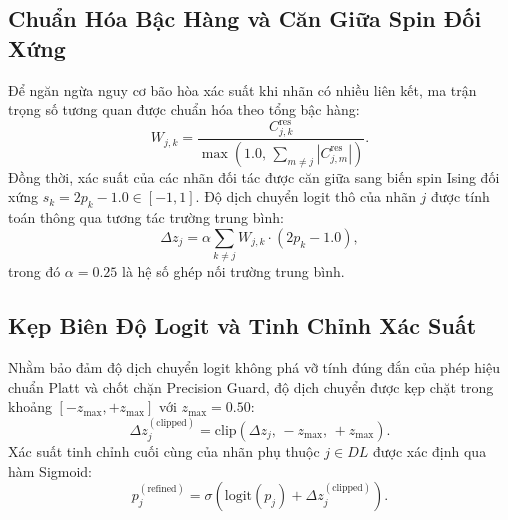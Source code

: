 \documentclass[10pt,a4paper,twoside]{article}
\begin{document}
\subsection{Chuẩn Hóa Bậc Hàng và Căn Giữa Spin Đối Xứng}
Để ngăn ngừa nguy cơ bão hòa xác suất khi nhãn có nhiều liên kết, ma trận trọng số tương quan được chuẩn hóa theo tổng bậc hàng:
\begin{equation}
W_{j, k} = \frac{C^{\text{res}}_{j, k}}{\max\left(1.0, \, \sum_{m \neq j} |C^{\text{res}}_{j, m}|\right)}.
\label{eq:degree_norm}
\end{equation}
Đồng thời, xác suất của các nhãn đối tác được căn giữa sang biến spin Ising đối xứng $s_k = 2 p_k - 1.0 \in [-1, 1]$. Độ dịch chuyển logit thô của nhãn $j$ được tính toán thông qua tương tác trường trung bình:
\begin{equation}
\Delta z_j = \alpha \sum_{k \neq j} W_{j, k} \cdot (2 p_k - 1.0),
\end{equation}
trong đó $\alpha = 0.25$ là hệ số ghép nối trường trung bình.

\subsection{Kẹp Biên Độ Logit và Tinh Chỉnh Xác Suất}
Nhằm bảo đảm độ dịch chuyển logit không phá vỡ tính đúng đắn của phép hiệu chuẩn Platt và chốt chặn Precision Guard, độ dịch chuyển được kẹp chặt trong khoảng $[-z_{\max}, +z_{\max}]$ với $z_{\max} = 0.50$:
\begin{equation}
\Delta z_j^{(\text{clipped})} = \text{clip}\left(\Delta z_j, \, -z_{\max}, \, +z_{\max}\right).
\end{equation}
Xác suất tinh chỉnh cuối cùng của nhãn phụ thuộc $j \in DL$ được xác định qua hàm Sigmoid:
\begin{equation}
p_j^{(\text{refined})} = \sigma\left(\text{logit}(p_j) + \Delta z_j^{(\text{clipped})}\right).
\label{eq:refined_prob}
\end{equation}
\end{document}
